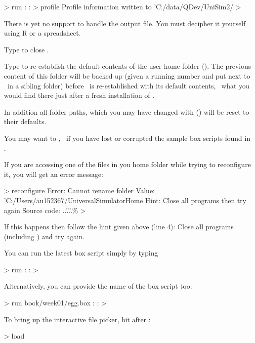 \lstset{numbers=left}
\begin{usdialog}
> run
:
:
> profile
Profile information written to 'C:/data/QDev/UniSim2/%
> 
\end{usdialog}
\lstset{numbers=none}

There is yet no support to handle the output file. You must decipher it yourself using R or a spreadsheet.
                

Type  to close \US.
                            

Type  to re-establish the default contents of the user home folder (\ushome). The previous content of this folder will be backed up (given a running number and put next to \ushome\ in a sibling folder) before \ushome\ is re-established with its default contents, \ie\ what you would find there just after a fresh installation of \US. 

In addition all folder paths, which you may have changed with  () will be reset to their defaults.

You may want to , \eg\ if you have lost or corrupted the sample box scripts found in .

If you are accessing one of the files in you home folder while trying to reconfigure it, you will get an error message:
\lstset{numbers=left}
\begin{userror}
> reconfigure
Error: Cannot rename folder
Value: 'C:/Users/au152367/UniversalSimulatorHome %
Hint: Close all programs then try again
Source code: ..\..\..\..\src\plugins\base\%\brk%
>
\end{userror}
\lstset{numbers=none}
If this happens then follow the hint given above (line 4): Close all programs (including \US) and try again.


You can run the latest box script simply by typing
\begin{usdialog}
> run
:
:
>
\end{usdialog}
Alternatively, you can provide the name of the box script too:
\begin{usdialog}
> run book/week01/egg.box
:
:
>
\end{usdialog}
To bring up the interactive file picker, hit  after :
\begin{usdialog}
> load %
\end{usdialog}


